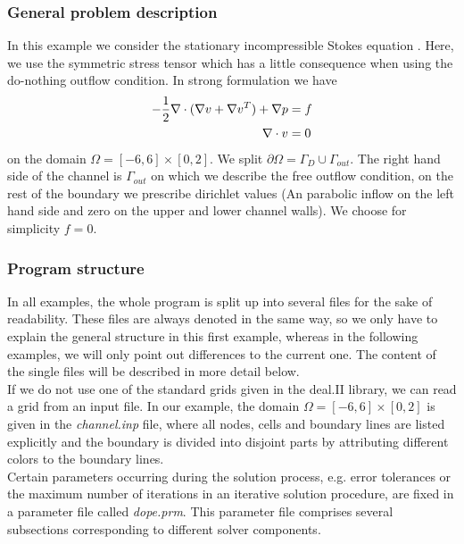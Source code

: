 \subsubsection{General problem description}
In this example we consider the stationary incompressible Stokes equation . Here,
we use the symmetric stress tensor which has a little consequence when using 
the do-nothing outflow condition. In strong formulation we have
\begin{align} \label{eq:strong}
-\frac{1}{2}\nabla\cdot (\nabla v + \nabla v^{T}) + \nabla p &= f \\ 
\nabla \cdot v &= 0 \notag
\end{align} 
on the domain $\Omega = [-6,6]\times [0,2]$. We split $\partial \Omega = \Gamma_D \cup \Gamma_{out}$. The right hand side of the channel is $\Gamma_{out}$ on which we describe the free outflow condition, on the rest of the boundary we prescribe dirichlet values (An parabolic inflow on the left hand side and zero on the upper and lower channel walls). We choose for simplicity $f=0$.\\

\subsubsection{Program structure}

In all examples, the whole program is split up into several files for the sake of readability. These files are always denoted in the same way, so we only have to explain the general structure in this first example, whereas in the following examples, we will only point out differences to the current one. The content of the single files will be described in more detail below.\\

If we do not use one of the standard grids given in the deal.II library, we can read a grid from an input file. In our example, the domain $\Omega = [-6,6]\times [0,2]$ is given in the \textit{channel.inp} file, where all nodes, cells and boundary lines are listed explicitly and the boundary is divided into disjoint parts by attributing different colors to the boundary lines.\\

Certain parameters occurring during the solution process, e.g. error tolerances or the maximum number of iterations in an iterative solution procedure, are fixed in a parameter file called \textit{dope.prm}. This parameter file comprises several subsections corresponding to different solver components.\\

